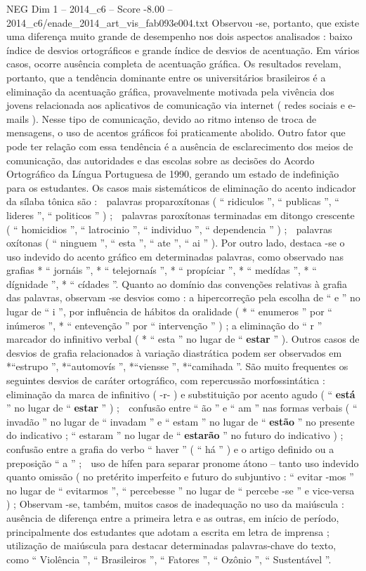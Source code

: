 \begin{textsample}{NEG Dim 1 – 2014\_c6 – Score -8.00 – 2014\_c6/enade\_2014\_art\_vis\_fab093e004.txt}
Observou -se, portanto, que existe uma diferença muito grande de desempenho nos dois aspectos analisados : baixo índice de desvios ortográficos e grande índice de desvios de acentuação.
Em vários casos, ocorre ausência completa de acentuação gráfica.
Os resultados revelam, portanto, que a tendência dominante entre os universitários brasileiros é a eliminação da acentuação gráfica, provavelmente motivada pela vivência dos jovens relacionada aos aplicativos de comunicação via internet ( redes sociais e e-mails ).
Nesse tipo de comunicação, devido ao ritmo intenso de troca de mensagens, o uso de acentos gráficos foi praticamente abolido.
Outro fator que pode ter relação com essa tendência é a ausência de esclarecimento dos meios de comunicação, das autoridades e das escolas sobre as decisões do Acordo Ortográfico da Língua Portuguesa de 1990, gerando um estado de indefinição para os estudantes.
Os casos mais sistemáticos de eliminação do acento indicador da sílaba tônica são :  palavras proparoxítonas ( “ ridiculos ”, “ publicas ”, “ lideres ”, “ politicos ” ) ;  palavras paroxítonas terminadas em ditongo crescente ( “ homicidios ”, “ latrocinio ”, “ individuo ”, “ dependencia ” ) ;  palavras oxítonas ( “ ninguem ”, “ esta ”, “ ate ”, “ ai ” ).
Por outro lado, destaca -se o uso indevido do acento gráfico em determinadas palavras, como observado nas grafias * “ jornáis ”, * “ telejornaís ”, * “ propíciar ”, * “ medídas ”, * “ dígnidade ”, * “ cídades ”.
Quanto ao domínio das convenções relativas à grafia das palavras, observam -se desvios como : a hipercorreção pela escolha de “ e ” no lugar de “ i ”, por influência de hábitos da oralidade ( * “ enumeros ” por “ inúmeros ”, * “ entevenção ” por “ intervenção ” ) ; a eliminação do “ r ” marcador do infinitivo verbal ( * “ esta ” no lugar de “ \textbf{estar} ” ).
Outros casos de desvios de grafia relacionados à variação diastrática podem ser observados em *“estrupo ”, *“automovís ”, *“viensse ”, *“camihada ”.
São muito frequentes os seguintes desvios de caráter ortográfico, com repercussão morfossintática :  eliminação da marca de infinitivo ( -r- ) e substituição por acento agudo ( “ \textbf{está} ” no lugar de “ \textbf{estar} ” ) ;  confusão entre “ ão ” e “ am ” nas formas verbais ( “ invadão ” no lugar de “ invadam ” e “ estam ” no lugar de “ \textbf{estão} ” no presente do indicativo ; “ estaram ” no lugar de “ \textbf{estarão} ” no futuro do indicativo ) ;  confusão entre a grafia do verbo “ haver ” ( “ há ” ) e o artigo definido ou a preposição “ a ” ;  uso de hífen para separar pronome átono – tanto uso indevido quanto omissão ( no pretérito imperfeito e futuro do subjuntivo : “ evitar -mos ” no lugar de “ evitarmos ”, “ percebesse ” no lugar de “ percebe -se ” e vice-versa ) ; Observam -se, também, muitos casos de inadequação no uso da maiúscula : ausência de diferença entre a primeira letra e as outras, em início de período, principalmente dos estudantes que adotam a escrita em letra de imprensa ; utilização de maiúscula para destacar determinadas palavras-chave do texto, como “ Violência ”, “ Brasileiros ”, “ Fatores ”, “ Ozônio ”, “ Sustentável ”.

\end{textsample}
